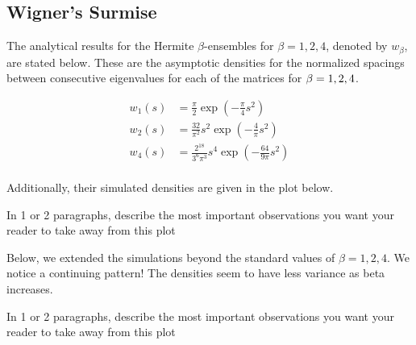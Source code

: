 \subsection{Wigner's Surmise}



The analytical results for the Hermite $\beta$-ensembles for $\beta = 1, 2, 4$, denoted by $w_\beta$, are stated below.
These are the asymptotic densities for the normalized spacings between consecutive eigenvalues for each of the matrices for $\beta = 1,2,4$.

\begin{align*}
  w_1(s) &= \frac{\pi}{2} \exp(-\frac{\pi}{4}s^2) \\
  w_2(s) &= \frac{32}{\pi^2} s^2 \exp(-\frac{4}{\pi}s^2) \\
  w_4(s) &= \frac{2^{18}}{3^{6}\pi^3} s^4 \exp(-\frac{64}{9\pi}s^2) \\
\end{align*}

Additionally, their simulated densities are given in the plot below.



In 1 or 2 paragraphs, describe the most important observations you want your reader to take away from this plot

\newpage


Below, we extended the simulations beyond the standard values of $\beta = 1,2,4$. We notice a continuing pattern! The densities seem to have less variance as
beta increases.



In 1 or 2 paragraphs, describe the most important observations you want your reader to take away from this plot
